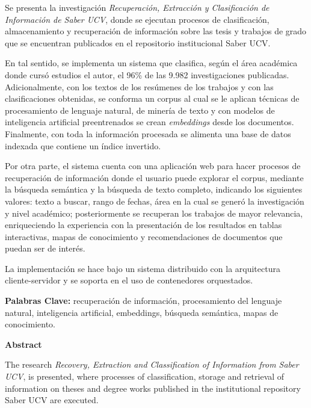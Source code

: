 Se presenta la investigación \emph{Recuperación, Extracción y Clasificación de Información de Saber UCV}, donde se ejecutan procesos de clasificación, almacenamiento y recuperación de información sobre las tesis y trabajos de grado que se encuentran publicados en el repositorio institucional Saber UCV.

En tal sentido, se implementa un sistema que clasifica, según el área académica donde cursó estudios el autor, el 96\% de las {9.982} investigaciones publicadas. Adicionalmente, con los textos de los resúmenes de los trabajos y con las clasificaciones obtenidas, se conforma un corpus al cual se le aplican técnicas de procesamiento de lenguaje natural, de minería de texto y con modelos de inteligencia artificial preentrenados se crean \textit{embeddings} desde los documentos. Finalmente, con toda la información procesada se alimenta una base de datos indexada que contiene un índice invertido.


Por otra parte, el sistema cuenta con una aplicación web para hacer procesos de recuperación de información donde el usuario puede explorar el corpus, mediante la búsqueda semántica y la búsqueda de texto completo, indicando los siguientes valores: texto a buscar, rango de fechas, área en la cual se generó la investigación y nivel académico; posteriormente se recuperan los trabajos de mayor relevancia, enriqueciendo la experiencia con la presentación de los resultados en tablas interactivas, mapas de conocimiento y recomendaciones de documentos que puedan ser de interés.

La implementación se hace bajo un sistema distribuido con la arquitectura cliente-servidor y se soporta en el uso de contenedores orquestados.

\vspace*{2cm}

\textbf{Palabras Clave:} recuperación de información, procesamiento del lenguaje natural, inteligencia artificial, embeddings, búsqueda semántica, mapas de conocimiento.




\newpage
\thispagestyle{empty}
\large{\textbf{Abstract}}

The research \emph{Recovery, Extraction and Classification of Information from Saber UCV}, is presented, where processes of classification, storage and retrieval of information on theses and degree works published in the institutional repository Saber UCV are executed.

